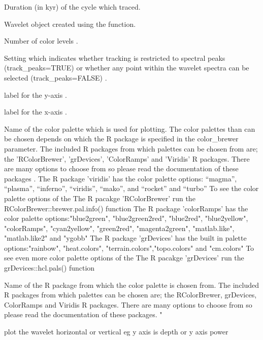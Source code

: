 \documentclass[a4paper]{book}
\begin{document}
\begin{Arguments}
\begin{ldescription}
\item[\code{astro\_cycle}] Duration (in kyr) of the cycle which traced.

\item[\code{wavelet}] Wavelet object created using the  function.

\item[\code{n.levels}] Number of color levels .

\item[\code{track\_peaks}] Setting which indicates whether tracking is restricted
to spectral peaks (track\_peaks=TRUE) or whether any point within the wavelet
spectra can be selected (track\_peaks=FALSE) .

\item[\code{periodlab}] label for the y-axis .

\item[\code{x\_lab}] label for the x-axis .

\item[\code{palette\_name}] Name of the color palette which is used for plotting.
The color palettes than can be chosen depends on which the R package is specified in
the color\_brewer parameter. The included R packages from which palettes can be chosen
from are; the 'RColorBrewer', 'grDevices', 'ColorRamps' and 'Viridis' R packages.
There are many options to choose from so please
read the documentation of these packages .
The R package 'viridis' has the color palette options: “magma”, “plasma”,
“inferno”, “viridis”, “mako”, and “rocket”  and “turbo”
To see the color palette options of the The R pacakge 'RColorBrewer' run
the RColorBrewer::brewer.pal.info() function
The R package 'colorRamps' has the color palette options:"blue2green",
"blue2green2red", "blue2red",    "blue2yellow", "colorRamps",    "cyan2yellow",
"green2red", "magenta2green", "matlab.like", "matlab.like2" and    "ygobb"
The R package 'grDevices' has the built in  palette options:"rainbow",
"heat.colors", "terrain.colors","topo.colors" and "cm.colors"
To see even more color palette options of the The R pacakge 'grDevices' run
the grDevices::hcl.pals() function

\item[\code{color\_brewer}] Name of the R package from which the color palette is chosen from.
The included R packages from which palettes can be chosen
are; the RColorBrewer, grDevices, ColorRamps and Viridis R packages.
There are many options to choose from so please
read the documentation of these packages. "

\item[\code{plot\_horizontal}] plot the wavelet horizontal or vertical eg y axis is depth or y axis power  
\end{ldescription}
\end{Arguments}
\end{document}
